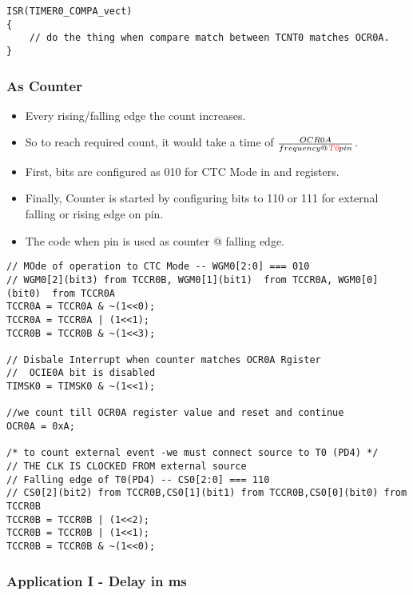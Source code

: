 \begin{verbatim}
ISR(TIMER0_COMPA_vect)
{
    // do the thing when compare match between TCNT0 matches OCR0A.
}
\end{verbatim}


\subsubsection{As Counter}
\begin{itemize}
    \item Every rising/falling edge the count increases.
    \item So to reach required count, it would take a time of $\frac{OCR0A}{frequency @ \emph{\textcolor{red}{T0}} pin}$.
    \item First,  bits are configured as 010 for CTC Mode in  and  registers.
    \item Finally, Counter is started by configuring  bits to 110 or 111 for external falling or rising edge on  pin.
    \item The code when  pin is used as counter @ falling edge.
\end{itemize}

\begin{verbatim}
// MOde of operation to CTC Mode -- WGM0[2:0] === 010
// WGM0[2](bit3) from TCCR0B, WGM0[1](bit1)  from TCCR0A, WGM0[0](bit0)  from TCCR0A
TCCR0A = TCCR0A & ~(1<<0);
TCCR0A = TCCR0A | (1<<1);
TCCR0B = TCCR0B & ~(1<<3);
    
// Disbale Interrupt when counter matches OCR0A Rgister
//  OCIE0A bit is disabled
TIMSK0 = TIMSK0 & ~(1<<1);

//we count till OCR0A register value and reset and continue 
OCR0A = 0xA;

/* to count external event -we must connect source to T0 (PD4) */
// THE CLK IS CLOCKED FROM external source
// Falling edge of T0(PD4) -- CS0[2:0] === 110
// CS0[2](bit2) from TCCR0B,CS0[1](bit1) from TCCR0B,CS0[0](bit0) from TCCR0B
TCCR0B = TCCR0B | (1<<2);
TCCR0B = TCCR0B | (1<<1);
TCCR0B = TCCR0B & ~(1<<0);
\end{verbatim}

\subsubsection{Application I - Delay in ms}

